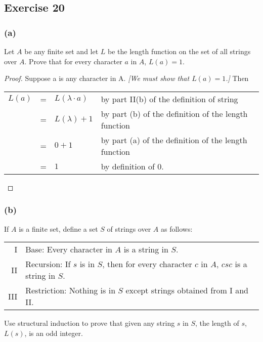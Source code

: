 \documentclass[14pt]{extarticle}
\newcommand{\cy}{\color{cyan}}
\begin{document}
\subsection{Exercise 20}

\subsubsection{(a)}
Let $A$ be any finite set and let $L$ be the length function on the set of all strings over $A$.
Prove that for every character $a$ in $A$, $L(a) = 1$.

\begin{proof}
    Suppose a is any character in A. {\it [We must show that \(L(a) = 1\).]} Then
    \begin{center}
        \begin{tabular}{rcll}
            \(L(a)\) & = & \(L(\lambda \cdot a)\) & {\cy by part II(b) of the definition of string}            \\
                     & = & \(L(\lambda) + 1\)     & {\cy by part (b) of the definition of the length function} \\
                     & = & \(0 + 1\)              & {\cy by part (a) of the definition of the length function} \\
                     & = & \(1\)                  & {\cy by definition of 0.}
        \end{tabular}
    \end{center}
\end{proof}

\subsubsection{(b)}
If $A$ is a finite set, define a set $S$ of strings over $A$ as follows:

\begin{tabular}{rl}
    I   & Base: Every character in $A$ is a string in $S$.                                            \\
    II  & Recursion: If $s$ is in $S$, then for every character $c$ in $A$, $csc$ is a string in $S$. \\
    III & Restriction: Nothing is in $S$ except strings obtained from I and II.
\end{tabular}

Use structural induction to prove that given any string $s$ in $S$, the length of $s$, $L(s)$, is an odd integer.
\end{document}

